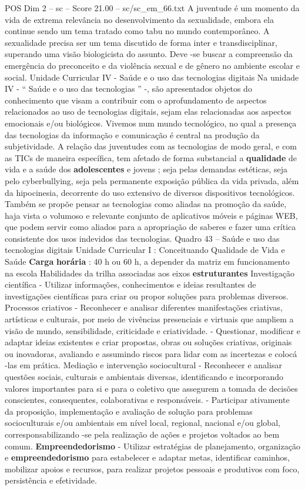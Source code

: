 \begin{textsample}{POS Dim 2 – sc – Score 21.00 – sc/sc\_em\_66.txt}
A juventude é um momento da vida de extrema relevância no desenvolvimento da sexualidade, embora ela continue sendo um tema tratado como tabu no mundo contemporâneo.
A sexualidade precisa ser um tema discutido de forma inter e transdisciplinar, superando uma visão biologicista do assunto.
Deve -se buscar a compreensão da emergência do preconceito e da violência sexual e de gênero no ambiente escolar e social.
Unidade Curricular IV - Saúde e o uso das tecnologias digitais Na unidade IV - “ Saúde e o uso das tecnologias ” -, são apresentados objetos do conhecimento que visam a contribuir com o aprofundamento de aspectos relacionados ao uso de tecnologias digitais, sejam elas relacionadas aos aspectos emocionais e/ou biológicos.
Vivemos num mundo tecnológico, no qual a presença das tecnologias da informação e comunicação é central na produção da subjetividade.
A relação das juventudes com as tecnologias de modo geral, e com as TICs de maneira específica, tem afetado de forma substancial a \textbf{qualidade} de vida e a saúde dos \textbf{adolescentes} e jovens ; seja pelas demandas estéticas, seja pelo cyberbullying, seja pela permanente exposição pública da vida privada, além da hipocinesia, decorrente do uso extensivo de diversos dispositivos tecnológicos.
Também se propõe pensar as tecnologias como aliadas na promoção da saúde, haja vista o volumoso e relevante conjunto de aplicativos móveis e páginas WEB, que podem servir como aliados para a apropriação de saberes e fazer uma crítica consistente dos usos indevidos das tecnologias.
Quadro 43 – Saúde e uso das tecnologias digitais Unidade Curricular I : Conceituando Qualidade de Vida e Saúde \textbf{Carga} \textbf{horária} : 40 h ou 60 h, a depender da matriz em funcionamento na escola Habilidades da trilha associadas aos eixos \textbf{estruturantes} Investigação científica - Utilizar informações, conhecimentos e ideias resultantes de investigações científicas para criar ou propor soluções para problemas diversos.
Processos criativos - Reconhecer e analisar diferentes manifestações criativas, artísticas e culturais, por meio de vivências presenciais e virtuais que ampliem a visão de mundo, sensibilidade, criticidade e criatividade. - Questionar, modificar e adaptar ideias existentes e criar propostas, obras ou soluções criativas, originais ou inovadoras, avaliando e assumindo riscos para lidar com as incertezas e colocá -las em prática.
Mediação e intervenção sociocultural - Reconhecer e analisar questões sociais, culturais e ambientais diversas, identificando e incorporando valores importantes para si e para o coletivo que assegurem a tomada de decisões conscientes, consequentes, colaborativas e responsáveis. - Participar ativamente da proposição, implementação e avaliação de solução para problemas socioculturais e/ou ambientais em nível local, regional, nacional e/ou global, corresponsabilizando -se pela realização de ações e projetos voltados ao bem comum. \textbf{Empreendedorismo} - Utilizar estratégias de planejamento, organização e \textbf{empreendedorismo} para estabelecer e adaptar metas, identificar caminhos, mobilizar apoios e recursos, para realizar projetos pessoais e produtivos com foco, persistência e efetividade.

\end{textsample}
